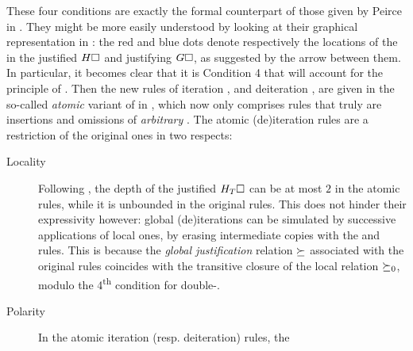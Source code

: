 \begin{scope}
These four conditions are exactly the formal counterpart of those given by
Peirce in \cite{peirce_prolegomena_1906}. They might be more easily understood
by looking at their graphical representation in :
the red and blue dots denote respectively the locations of the  in the
justified  $H\square$ and justifying  $G\square$, as suggested by the
arrow between them. In particular, it becomes clear that it is Condition 4 that
will account for the principle of . Then the new rules of
iteration ,  and deiteration ,
 are given in the so-called \emph{atomic} variant  of
 in , which now only comprises rules that
truly are insertions and omissions of \emph{arbitrary} . The atomic (de)iteration
rules are a restriction of the original ones in two respects:
\begin{description}
  \item[Locality] Following , the depth of the
  justified  $H_T\square$ can be at most $2$ in the atomic rules, while it
  is unbounded in the original rules. This does not hinder their expressivity
  however: global (de)iterations can be simulated by successive applications of
  local ones, by erasing intermediate copies with the  and 
  rules. This is because the \emph{global justification} relation $\mathbin{\succeq}$
  associated with the original rules coincides with the transitive closure of
  the local relation $\mathbin{\succeq_0}$, modulo the 4\textsuperscript{th} condition for
  double-.
  \item[Polarity] In the atomic iteration (resp. deiteration) rules, the

\end{description}
\end{scope}
